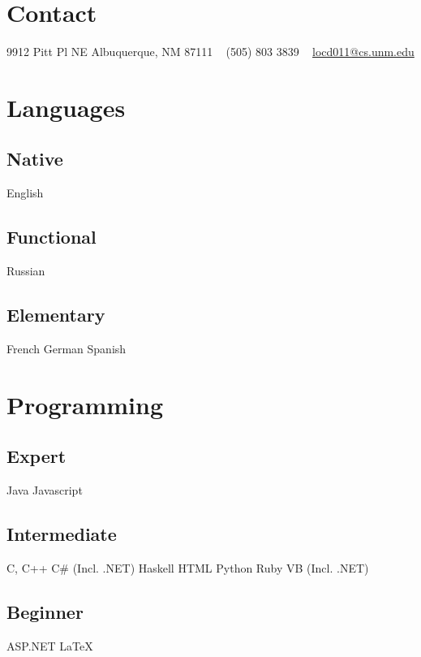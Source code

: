 \documentclass[]{friggeri-cv} %
\begin{document}


\begin{aside} %
\section{Contact}
9912 Pitt Pl NE
Albuquerque, NM 87111
~
(505) 803 3839
~
\href{mailto:locd011@gmail.com}{locd011@cs.unm.edu}
\section{Languages}
\subsection{Native}
English
\subsection{Functional}
Russian
\subsection{Elementary}
French
German
Spanish
\section{Programming}
\subsection{Expert}
Java
Javascript
\subsection{Intermediate}
C, C++
C\# (Incl. .NET)
Haskell
HTML
Python
Ruby
VB (Incl. .NET)
\subsection{Beginner}
ASP.NET
LaTeX
\end{aside}

\end{document}

